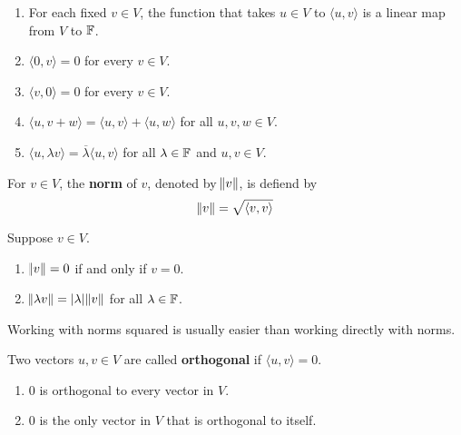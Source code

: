 \documentclass{extarticle}
\begin{document}
\begin{corollary}
    \begin{enumerate}[label=(\alph*)]
        \item For each fixed \(v \in V\), the function that takes \(u \in V\) to 
        \(\langle u,v \rangle\) is a linear map from \(V\) to \(\mathbb{F}\).
        \item \(\langle 0,v \rangle = 0\) for every \(v \in V\). 
        \item \(\langle v,0 \rangle = 0\) for every \(v \in V\). 
        \item \(\langle u,v + w \rangle = \langle u,v \rangle + \langle u,w \rangle\) 
        for all \(u, v, w \in V\).
        \item \(\langle u,\lambda v \rangle = \overline{\lambda} \langle u,v \rangle\)
        for all \(\lambda \in \mathbb{F}\) and \(u, v \in V\).
    \end{enumerate}
\end{corollary}

\begin{definition}
    For \(v \in V\), the \textbf{norm} of \(v\), denoted by \(\norm{v}\), is defiend by 
    \[\norm{v} = \sqrt{\langle v,v \rangle}\]
\end{definition}


\begin{corollary}
    Suppose \(v \in V\). 
    \begin{enumerate}[label=(\alph*)]
        \item \(\norm{v} = 0\) if and only if \(v = 0\). 
        \item \(\norm{\lambda v} = |\lambda| \norm{v}\) for all \(\lambda \in \mathbb{F}\).
    \end{enumerate}
\end{corollary}


\begin{remark}
    Working with norms squared is usually easier than working directly with norms. 
\end{remark}

\begin{definition}[orthogonal]
    Two vectors \(u, v \in V\) are called \textbf{orthogonal} if \(\langle u,v \rangle = 0\).
\end{definition}

\begin{corollary}
    \begin{enumerate}[label=(\alph*)]
        \item 0 is orthogonal to every vector in \(V\). 
        \item 0 is the only vector in \(V\) that is orthogonal to itself.
    \end{enumerate}
\end{corollary}
\end{document}
